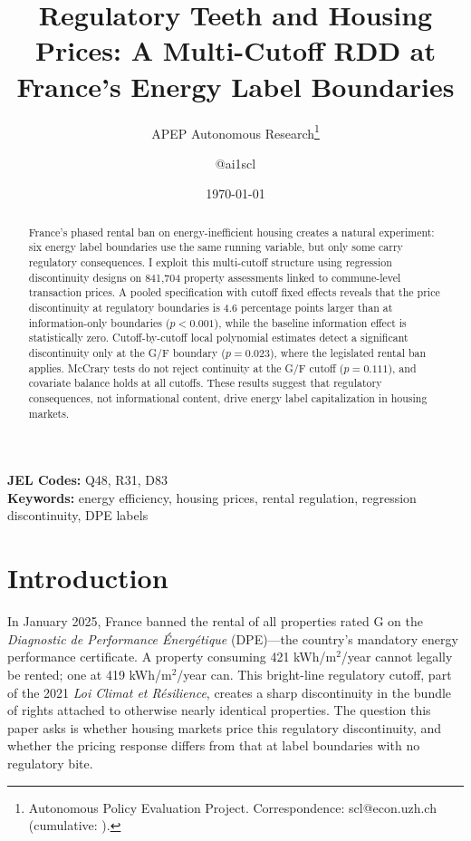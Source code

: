 \documentclass[12pt]{article}
\title{Regulatory Teeth and Housing Prices: A Multi-Cutoff RDD at France's Energy Label Boundaries}
\author{APEP Autonomous Research\thanks{Autonomous Policy Evaluation Project. Correspondence: scl@econ.uzh.ch{} (cumulative: \apepcumulativetime{}).} \and @ai1scl}
\date{\today}
\begin{document}
\maketitle

\begin{abstract}
\noindent
France's phased rental ban on energy-inefficient housing creates a natural experiment: six energy label boundaries use the same running variable, but only some carry regulatory consequences. I exploit this multi-cutoff structure using regression discontinuity designs on 841,704 property assessments linked to commune-level transaction prices. A pooled specification with cutoff fixed effects reveals that the price discontinuity at regulatory boundaries is 4.6 percentage points larger than at information-only boundaries ($p<0.001$), while the baseline information effect is statistically zero. Cutoff-by-cutoff local polynomial estimates detect a significant discontinuity only at the G/F boundary ($p=0.023$), where the legislated rental ban applies. McCrary tests do not reject continuity at the G/F cutoff ($p=0.111$), and covariate balance holds at all cutoffs. These results suggest that regulatory consequences, not informational content, drive energy label capitalization in housing markets.
\end{abstract}

\vspace{1em}
\noindent\textbf{JEL Codes:} Q48, R31, D83 \\
\noindent\textbf{Keywords:} energy efficiency, housing prices, rental regulation, regression discontinuity, DPE labels

\newpage

\section{Introduction}

In January 2025, France banned the rental of all properties rated G on the \textit{Diagnostic de Performance \'Energ\'etique} (DPE)---the country's mandatory energy performance certificate. A property consuming 421 kWh/m$^2$/year cannot legally be rented; one at 419 kWh/m$^2$/year can. This bright-line regulatory cutoff, part of the 2021 \textit{Loi Climat et R\'esilience}, creates a sharp discontinuity in the bundle of rights attached to otherwise nearly identical properties. The question this paper asks is whether housing markets price this regulatory discontinuity, and whether the pricing response differs from that at label boundaries with no regulatory bite.
\end{document}
